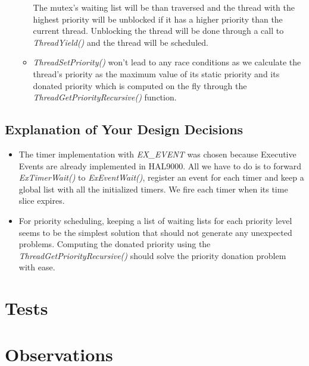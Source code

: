 \documentclass{report}
\begin{document}
\begin{enumerate}
\begin{itemize}
				 The mutex's waiting list will be than traversed and the thread with the highest priority will be unblocked if it has a higher priority than the current thread.
				 Unblocking the thread will be done through a call to \textit{ThreadYield()} and the thread will be scheduled.
		   \item \textit{ThreadSetPriority()} won't lead to any race conditions as we calculate the thread's priority as the maximum value of its 
				 static priority and its donated priority which is computed on the fly through the \textit{ThreadGetPriorityRecursive()} function.	
        \end{itemize}
    
\end{enumerate}


\subsection{Explanation of Your Design Decisions}
	\begin{itemize}
		\item The timer implementation with \textit{EX\_EVENT} was chosen because Executive Events are already implemented in HAL9000. All we 
			  have to do is to forward \textit{ExTimerWait()} to \textit{ExEventWait()}, register an event for each timer and keep a global list
			  with all the initialized timers. We fire each timer when its time slice expires.
		\item For priority scheduling, keeping a list of waiting lists for each priority level seems to be the simplest solution that should not	
			  generate any unexpected problems. Computing the donated priority using the \textit{ThreadGetPriorityRecursive()} should solve the
			  priority donation problem with ease.
	\end{itemize}

\section{Tests}

\section{Observations}
\end{document}
